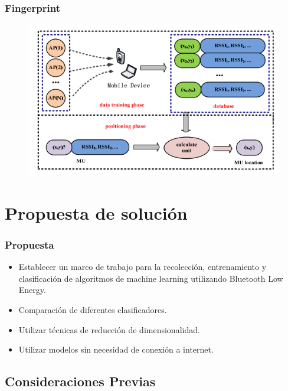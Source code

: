 \documentclass[mathserif]{beamer}
\begin{document}
\begin{frame}
\frametitle{Fingerprint}

\begin{figure}
\includegraphics[width=.8\linewidth]{../figures/finger.png}
\end{figure}

\end{frame}


\section{Propuesta de solución}

\begin{frame}
\frametitle{Propuesta}

\begin{itemize}
\item Establecer un marco de trabajo para la recolección, entrenamiento y clasificación de algoritmos de machine learning utilizando Bluetooth Low Energy.\\

\pause

\item Comparación de diferentes clasificadores.\\

\pause
\item Utilizar técnicas de reducción de dimensionalidad.\\
\pause

\item Utilizar modelos sin necesidad de conexión a internet.
\end{itemize}

\end{frame}


\subsection{Consideraciones Previas}
\end{document}
